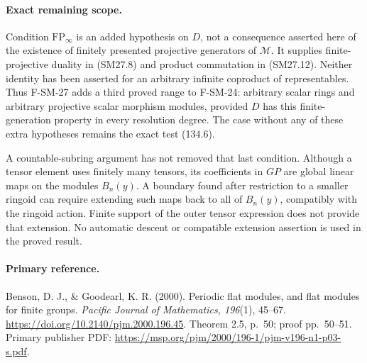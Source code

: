 \documentclass[11pt,a4paper]{article}
\theoremstyle{definition}\newtheorem{definition}[theorem]{Definition}
\theoremstyle{remark}\newtheorem{remark}[theorem]{Remark}
\begin{document}
\paragraph{Exact remaining scope.}
Condition \(\mathrm{FP}_\infty\) is an added hypothesis on \(D\),
not a consequence asserted here of the existence of finitely
presented projective generators of \(\mathcal M\).
It supplies finite-projective duality in (SM27.8) and product
commutation in (SM27.12).  Neither identity has been asserted for an
arbitrary infinite coproduct of representables.
Thus F-SM-27 adds a third proved range to F-SM-24:
arbitrary scalar rings and arbitrary projective scalar morphism
modules, provided \(D\) has this finite-generation property in every
resolution degree.  The case without any of these extra hypotheses
remains the exact test (134.6).

A countable-subring argument has not removed that last condition.
Although a tensor element uses finitely many tensors, its coefficients
in \(GP\) are global linear maps on the modules \(B_n(y)\).
A boundary found after restriction to a smaller ringoid can require
extending such maps back to all of \(B_n(y)\), compatibly with the
ringoid action.  Finite support of the outer tensor expression does
not provide that extension.  No automatic descent or compatible
extension assertion is used in the proved result.

\paragraph{Primary reference.}
Benson, D. J., \& Goodearl, K. R. (2000).
Periodic flat modules, and flat modules for finite groups.
\emph{Pacific Journal of Mathematics, 196}(1), 45--67.
\url{https://doi.org/10.2140/pjm.2000.196.45}.
Theorem 2.5, p.~50; proof pp.~50--51.
Primary publisher PDF:
\url{https://msp.org/pjm/2000/196-1/pjm-v196-n1-p03-s.pdf}.



\end{document}

